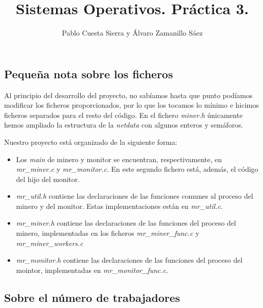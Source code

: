 \documentclass{article}
\begin{document}
\title{Sistemas Operativos. Práctica 3.}
\author{Pablo Cuesta Sierra y Álvaro Zamanillo Sáez}
\maketitle

\begin{tcolorbox}
\tableofcontents
\end{tcolorbox}

\subsection*{Pequeña nota sobre los ficheros}

Al principio del desarrollo del proyecto, no sabíamos hasta que punto podíamos modificar los ficheros proporcionados, por lo que los tocamos lo mínimo e hicimos ficheros separados para el resto del código. En el fichero \emph{miner.h} únicamente hemos ampliado la estructura de la \emph{netdata} con algunos enteros y semáforos.

Nuestro proyecto está organizado de la siguiente forma:
\begin{itemize}
    \item
    Los \emph{main} de minero y monitor se encuentran, respectivamente, en \emph{mr\_miner.c} y \emph{mr\_monitor.c}.
    En este segundo fichero está, además, el código del hijo del monitor.
    
    \item
    \emph{mr\_util.h} contiene las declaraciones de las funciones comunes al proceso del minero y del monitor. Estas implementaciones están en \emph{mr\_util.c}.

    \item
    \emph{mr\_miner.h} contiene las declaraciones de las funciones del proceso del minero, implementadas en los ficheros \emph{mr\_miner\_func.c} y \emph{mr\_miner\_workers.c}

    \item 
    \emph{mr\_monitor.h} contiene las declaraciones de las funciones del proceso del mointor, implementadas en \emph{mr\_monitor\_func.c}.
\end{itemize}




\subsection*{Sobre el número de trabajadores}
\end{document}
